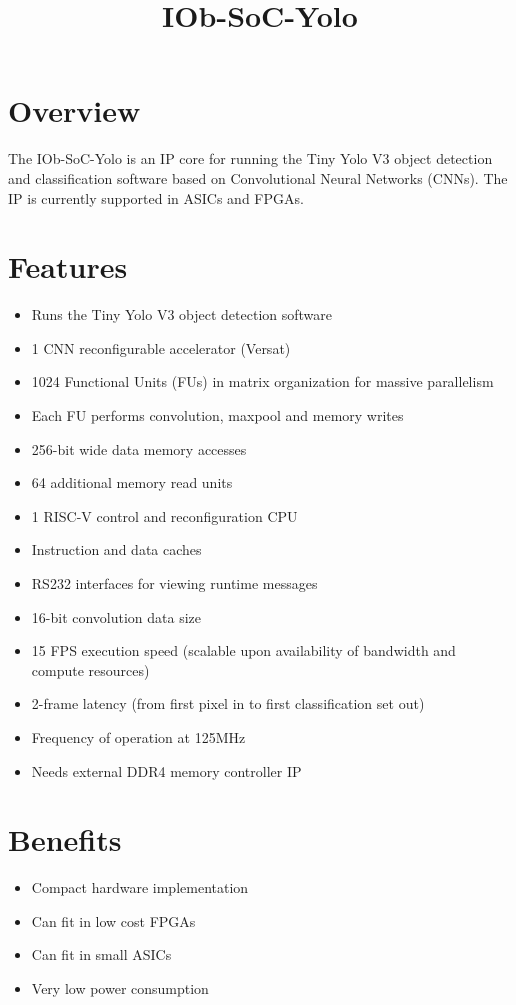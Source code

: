 \documentclass[twocolumn]{iob_pb}
\title{IOb-SoC-Yolo}
\newcommand\BackgroundPic{%
\put(0,0){%
\parbox[b][\paperheight]{\paperwidth}{%
\vfill
\centering
\texttt{[image: bg.png]}%
\vfill
}}}
\begin{document}
\AddToShipoutPicture*{\BackgroundPic}

\section*{\textcolor[rgb]{0,0,0}{Overview}}

The IOb-SoC-Yolo is an IP core for running the Tiny Yolo V3 object detection and
classification software based on Convolutional Neural Networks (CNNs). The IP is
currently supported in ASICs and FPGAs.

\section*{\textcolor[rgb]{0,0,0}{Features}}
\begin{itemize}
\item Runs the Tiny Yolo V3 object detection software
\item 1 CNN reconfigurable accelerator (Versat)
\item 1024 Functional Units (FUs) in matrix organization for massive parallelism
\item Each FU performs convolution, maxpool and memory writes
\item 256-bit wide data memory accesses
\item 64 additional memory read units
\item 1 RISC-V control and reconfiguration CPU
\item Instruction and data caches
\item RS232 interfaces for viewing runtime messages
\item 16-bit convolution data size
\item 15 FPS execution speed (scalable upon availability of bandwidth and compute resources)
\item 2-frame latency (from first pixel in to first classification set out)
\item Frequency of operation at 125MHz
\item Needs external DDR4 memory controller IP
\end{itemize}

\section*{\textcolor[rgb]{0,0,0}{Benefits}}
\begin{itemize}
\item Compact hardware implementation
\item Can fit in low cost FPGAs
\item Can fit in small ASICs 
\item Very low power consumption
\end{itemize}
\end{document}
